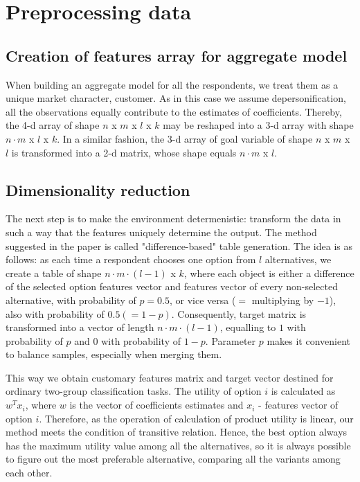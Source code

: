 \documentclass[a4paper, 12pt]{extreport}
\begin{document}
\section{Preprocessing data}

\subsection{Creation of features array for aggregate model}

When building an aggregate model for all the respondents, we treat them as a unique market character, customer. As in this case we assume depersonification, all the observations equally contribute to
the estimates of coefficients. Thereby, the 4-d array of shape $n$ x $m$ x $l$ x $k$ may be reshaped into a 3-d array with shape $n \cdot m$ x $l$ x $k$. In a similar fashion, the 3-d array of goal
variable of shape $n$ x $m$ x $l$ is transformed into a 2-d matrix, whose shape equals $n \cdot m$ x $l$.

\subsection{Dimensionality reduction}

The next step is to make the environment determenistic: transform the data in such a way that the features uniquely determine the output. The method suggested in the paper is called "difference-based" table generation.
The idea is as follows: as each time a respondent chooses one option from $l$ alternatives, we create a table of shape $ n \cdot m \cdot (l-1)$ x $k$, where each object is either a difference of the selected
option features vector and features vector of every non-selected alternative, with probability of $p = 0.5$, or vice versa ($=$ multiplying by $-1$), also with probability of $0.5 (= 1 - p)$. Consequently,
target matrix is transformed into a vector of length $n \cdot m \cdot (l-1)$, equalling to $1$ with probability of $p$ and $0$ with probability of $1-p$. Parameter $p$ makes it convenient to balance samples,
especially when merging them.

This way we obtain customary features matrix and target vector destined for ordinary two-group classification tasks. The utility of option $i$ is calculated as $w^T x_i$, where $w$ is the vector of coefficients
estimates and $x_i$ - features vector of option $i$. Therefore, as the operation of calculation of product utility is linear, our method meets the condition of transitive relation. Hence, the best option
always has the maximum utility value among all the alternatives, so it is always possible to figure out the most preferable alternative, comparing all the variants among each other. %
\end{document}
